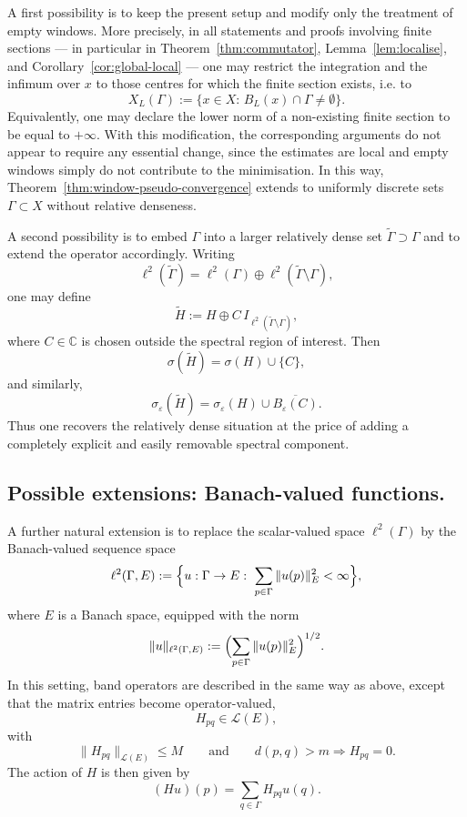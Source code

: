 \documentclass[11pt]{article}
\theoremstyle{definition}
\newcommand{\C}{\mathbb{C}}
\begin{document}
A first possibility is to keep the present setup and modify only the treatment of empty windows. More precisely, in all statements and proofs involving finite sections --- in particular in Theorem~\ref{thm:commutator}, Lemma~\ref{lem:localise}, and Corollary~\ref{cor:global-local} --- one may restrict the integration and the infimum over $x$ to those centres for which the finite section exists, i.e. to
\[
  X_L(\Gamma):=\{x\in X:\, B_L(x)\cap\Gamma\neq\emptyset\}.
\]
Equivalently, one may declare the lower norm of a non-existing finite section to be equal to $+\infty$. With this modification, the corresponding arguments do not appear to require any essential change, since the estimates are local and empty windows simply do not contribute to the minimisation. In this way, Theorem~\ref{thm:window-pseudo-convergence} extends to uniformly discrete sets $\Gamma\subset X$ without relative denseness.

A second possibility is to embed $\Gamma$ into a larger relatively dense set $\widetilde{\Gamma}\supset\Gamma$
and to extend the operator accordingly. Writing
\[
  \ell^2(\widetilde{\Gamma})
  =
  \ell^2(\Gamma)\oplus \ell^2(\widetilde{\Gamma}\setminus\Gamma),
\]
one may define
\[
  \widetilde{H}:=H\oplus C\,I_{\ell^2(\widetilde{\Gamma}\setminus\Gamma)},
\]
where $C\in\C$ is chosen outside the spectral region of interest. Then
\[
  \sigma(\widetilde{H})=\sigma(H)\cup\{C\},
\]
and similarly,
\[
  \sigma_\varepsilon(\widetilde{H})
  =
  \sigma_\varepsilon(H)\cup \overline{B_\varepsilon(C)}.
\]
Thus one recovers the relatively dense situation at the price of adding a completely explicit and
easily removable spectral component.

\subsection{Possible extensions: Banach-valued functions.}
A further natural extension is to replace the scalar-valued space $\ell^2(\Gamma)$ by the Banach-valued sequence space
\[
  \ell^2(\Gamma,E)
  :=
  \Bigl\{u:\Gamma\to E:\ \sum_{p\in\Gamma}\|u(p)\|_E^2<\infty\Bigr\},
\]
where $E$ is a Banach space, equipped with the norm
\[
  \|u\|_{\ell^2(\Gamma,E)}
  :=
  \Bigl(\sum_{p\in\Gamma}\|u(p)\|_E^2\Bigr)^{1/2}.
\]
In this setting, band operators are described in the same way as above, except that the matrix entries become operator-valued,
\[
  H_{pq}\in\mathcal L(E),
\]
with
\[
  \|H_{pq}\|_{\mathcal L(E)}\le M
  \qquad\text{and}\qquad
  d(p,q)>m \Longrightarrow H_{pq}=0.
\]
The action of $H$ is then given by
\[
  (Hu)(p)=\sum_{q\in\Gamma}H_{pq}u(q).
\]
\end{document}
